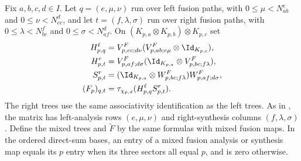 \begin{definition}
    \label{def:mpo_mixed_f_trees}
    \leanok
    Fix $a,b,c,d\in I$. Let $q=(e,\mu,\nu)$ run over left fusion
    paths, with $0\leq\mu<N_{ab}^e$ and $0\leq\nu<N_{ec}^d$,
    and let $t=(f,\lambda,\sigma)$ run over right fusion paths,
    with $0\leq\lambda<N_{bc}^f$ and $0\leq\sigma<N_{af}^d$.
    On $(K_{p,a}\otimes K_{p,b})\otimes K_{p,c}$ set
    \begin{align}
        H^\ell_{p,q}
         & =V^F_{p,ec;d\nu}(V^F_{p,ab;e\mu}\otimes\Id_{K_{p,c}}),
        \label{eq:mpo_mix_symbols_f_trees}                                \\
        H^r_{p,t}
         & =V^F_{p,af;d\sigma}(\Id_{K_{p,a}}\otimes V^F_{p,bc;f\lambda}),
        \notag                                                            \\
        S^r_{p,t}
         & =(\Id_{K_{p,a}}\otimes W^F_{p,bc;f\lambda})W^F_{p,af;d\sigma},
        \notag                                                            \\
        (F_p)_{q,t}
         & =\tau_{\chi_{p,d}}(H^\ell_{p,q}S^r_{p,t}).
        \label{eq:mpo_mix_symbols_f_trace}
    \end{align}
    The right trees use the same associativity identification as the
    left trees. As in \cite[Section~2]{GarreRubio2023MPOSym}, the matrix
    has left-analysis rows $(e,\mu,\nu)$ and right-synthesis columns
    $(f,\lambda,\sigma)$. Define the mixed trees and
    $\widetilde F$ by the same formulas with mixed fusion maps.
    In the ordered direct-sum bases, an entry of a mixed fusion
    analysis or synthesis map equals its $p$ entry when its three
    sectors all equal $p$, and is zero otherwise.
\end{definition}


